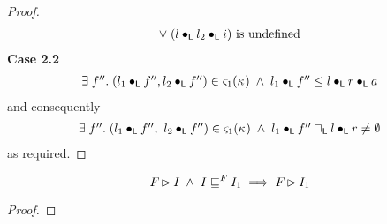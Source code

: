 \begin{lemma}[]
\begin{proof}
\begin{align}
	\lor\; (l \bullet_{\textsf{L}} l_2 \bullet_{\textsf{L}} i) \text{ is undefined}\label{L2:Case2.1}
\end{align}
%
%
%
%
%
\noindent\textbf{Case 2.2} 
%
\[
\begin{array}{l}
	\exists\; f''.\; (l_1 \bullet_{\textsf{L}} f'', l_2 \bullet_{\textsf{L}} f'') \in \varsigma_{1}(\kappa_{}) \;\land\; l_1 \bullet_{\textsf{L}} f'' \leq l \bullet_{\textsf{L}} r \bullet_{\textsf{L}} a
\end{array}
\]
and consequently 
\begin{align}
\begin{array}{l}
	\exists\; f''.\; (l_1 \bullet_{\textsf{L}} f'',\ l_2 \bullet_{\textsf{L}} f'') \in \varsigma_{1}(\kappa_{}) \;\land\; l_1 \bullet_{\textsf{L}} f'' \sqcap_{\textsf{L}} l \bullet_{\textsf{L}} r \not= \emptyset
\end{array} \label{L2:Case2.2}
\end{align}
%
as required.
\end{proof}
\end{lemma}
%
%
\begin{lemma}[]
%
\[
		F_{} \rhd I \;\land\; I \sqsubseteq^{F_{}} I_1 \implies F_{} \rhd I_1
\]
%
\begin{proof}
\todo
\end{proof}
\end{lemma}
%
%

